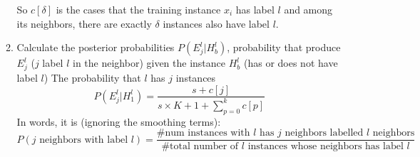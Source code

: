 \begin{enumerate}
\begin{enumerate}
                So $c[\delta]$ is the cases that the training instance
                $x_i$ has label $l$ and among its neighbors, there are exactly
                $\delta$ instances also have label $l$.
            \item Calculate the posterior probabilities $P(E_j^l|H_b^l)$,
                probability that produce $E_j^l$ ($j$ label $l$ in
                the neighbor) given the instance $H_b^l$ (has or does not
                have label $l$)
                The probability that $l$ has $j$ instances
                \[
                    P(E_j^l|H_1^l) = \frac{s + c[j]}{s\times{K+1} +
                    \sum_{p=0}^k c[p]}
                \]
                In words, it is (ignoring the smoothing terms):
                \[ P(\mbox{$j$ neighbors with
                label $l$}) = \frac{\#\mbox{num instances with $l$ has
                $j$ neighbors labelled $l$ neighbors}}{\#\mbox{total
                    number of $l$ instances whose
                neighbors has label $l$}}
            \]
        \end{enumerate}
\end{enumerate}

